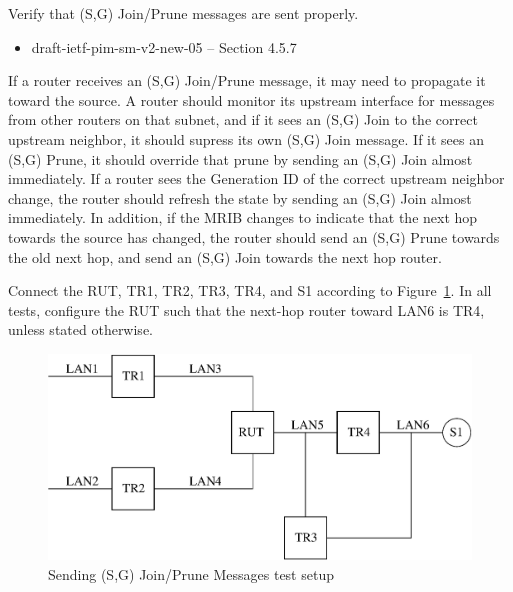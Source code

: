 \documentclass[11pt]{report}
\begin{document}
Verify that (S,G) Join/Prune messages are sent properly.

\begin{itemize}
  \item draft-ietf-pim-sm-v2-new-05 -- Section 4.5.7
\end{itemize}

If a router receives an (S,G) Join/Prune message, it may need to propagate
it toward the source. A router should monitor its upstream
interface for messages
from other routers on that subnet, and if it sees an (S,G) Join to the
correct upstream neighbor, it should supress its own (S,G) Join message.
If it sees an (S,G) Prune, it should override that prune by sending an
(S,G) Join almost immediately. If a router sees the Generation ID of the
correct upstream neighbor change, the router should refresh the state by
sending an (S,G) Join almost immediately. In addition, if the MRIB changes
to indicate that the next hop towards the source has changed, the router should
send an (S,G) Prune towards the old next hop, and send an (S,G) Join
towards the next hop router.

Connect the RUT, TR1, TR2, TR3, TR4, and S1 according to
Figure~\ref{fig:pim_test_4_7_sending_sg_join_prune_messages}.
In all tests, configure the RUT such that the next-hop router toward LAN6 is
TR4, unless stated otherwise.

\begin{figure}[htbp]
  \begin{center}
    \includegraphics[scale=0.8]{figs/pim_test_4_7_sending_sg_join_prune_messages}
    \caption{Sending (S,G) Join/Prune Messages test setup}
    \label{fig:pim_test_4_7_sending_sg_join_prune_messages}
  \end{center}
\end{figure}

\end{document}
